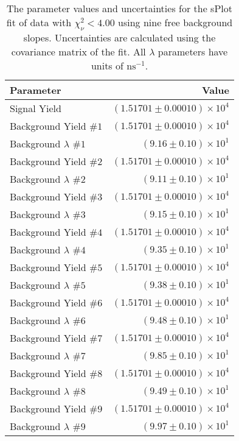 
\begin{table}[h]
    \begin{center}
        \begin{tabular}{lr}\toprule
            Parameter & Value \\\midrule
            Signal Yield & $(1.51701 \pm 0.00010) \times 10^{4}$ \\
            Background Yield $\#1$ & $(1.51701 \pm 0.00010) \times 10^{4}$ \\
            Background $\lambda$ $\#1$ & $(9.16 \pm 0.10) \times 10^{1}$ \\
            Background Yield $\#2$ & $(1.51701 \pm 0.00010) \times 10^{4}$ \\
            Background $\lambda$ $\#2$ & $(9.11 \pm 0.10) \times 10^{1}$ \\
            Background Yield $\#3$ & $(1.51701 \pm 0.00010) \times 10^{4}$ \\
            Background $\lambda$ $\#3$ & $(9.15 \pm 0.10) \times 10^{1}$ \\
            Background Yield $\#4$ & $(1.51701 \pm 0.00010) \times 10^{4}$ \\
            Background $\lambda$ $\#4$ & $(9.35 \pm 0.10) \times 10^{1}$ \\
            Background Yield $\#5$ & $(1.51701 \pm 0.00010) \times 10^{4}$ \\
            Background $\lambda$ $\#5$ & $(9.38 \pm 0.10) \times 10^{1}$ \\
            Background Yield $\#6$ & $(1.51701 \pm 0.00010) \times 10^{4}$ \\
            Background $\lambda$ $\#6$ & $(9.48 \pm 0.10) \times 10^{1}$ \\
            Background Yield $\#7$ & $(1.51701 \pm 0.00010) \times 10^{4}$ \\
            Background $\lambda$ $\#7$ & $(9.85 \pm 0.10) \times 10^{1}$ \\
            Background Yield $\#8$ & $(1.51701 \pm 0.00010) \times 10^{4}$ \\
            Background $\lambda$ $\#8$ & $(9.49 \pm 0.10) \times 10^{1}$ \\
            Background Yield $\#9$ & $(1.51701 \pm 0.00010) \times 10^{4}$ \\
            Background $\lambda$ $\#9$ & $(9.97 \pm 0.10) \times 10^{1}$ \\\bottomrule
        \end{tabular}
        \caption{The parameter values and uncertainties for the sPlot fit of data with $\chi^2_\nu < 4.00$ using nine free background slopes. Uncertainties are calculated using the covariance matrix of the fit. All $\lambda$ parameters have units of $\si{\nano\second}^{-1}$.}
    \end{center}
\end{table}
